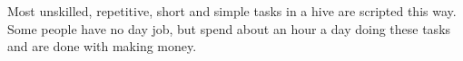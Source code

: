 Most unskilled, repetitive, short and simple tasks in a hive are scripted this way. Some people have no day job, but spend about an hour a day doing these tasks and are done with making money.

